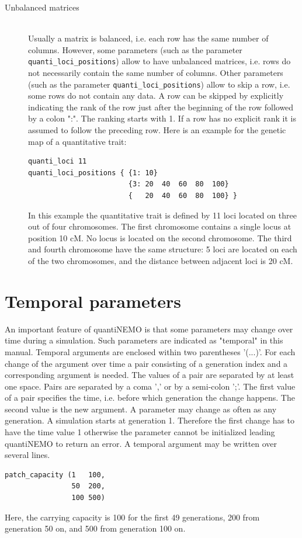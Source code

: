 \documentclass[letterpaper,12pt,oneside]{book}
\begin{document}
\begin{description}
\begin{description}
\item[Unbalanced matrices]\hspace*{\fill}\\
Usually a matrix is balanced, i.e. each row has the same number of columns. However, some parameters (such as the parameter \texttt{quanti\_loci\_positions}) allow to have unbalanced matrices, i.e. rows do not necessarily contain the same number of columns. Other parameters (such as the parameter \texttt{quanti\_loci\_positions}) allow to skip a row, i.e. some rows do not contain any data. A row can be skipped by explicitly indicating the rank of the row just after the beginning of the row followed by a colon ":". The ranking starts with 1. If a row has no explicit rank it is assumed to follow the preceding row. Here is an example for the genetic map of a quantitative trait:
\begin{lstlisting}[frame=single]
quanti_loci 11
quanti_loci_positions { {1: 10}
                        {3: 20  40  60  80  100}
                        {   20  40  60  80  100} }
\end{lstlisting} 
In this example the quantitative trait is defined by 11 loci located on three out of four chromosomes. The first chromosome contains a single locus at position 10 cM. No locus is located on the second chromosome. The third and fourth chromosome have the same structure: 5 loci are located on each of the two chromosomes, and the distance between adjacent loci is 20 cM.
\end{description}
\end{description}

\section{Temporal parameters}\label{tempParam}
An important feature of quantiNEMO is that some parameters may change over time during a simulation. Such parameters are indicated as "temporal" in this manual. Temporal arguments are enclosed within two parentheses '(...)'. For each change of the argument over time a pair consisting of a generation index and a corresponding argument is needed. The values of a pair are separated by at least one space. Pairs are separated by a coma ',' or by a semi-colon ';'. The first value of a pair specifies the time, i.e. before which generation the change happens. The second value is the new argument. A parameter may change as often as any generation. A simulation starts at generation 1. Therefore the first change has to have the time value 1 otherwise the parameter cannot be initialized leading quantiNEMO to return an error. A temporal argument may be written over several lines.
\begin{lstlisting}[frame=single]
patch_capacity (1   100, 
                50  200, 
                100 500)
\end{lstlisting}
Here, the carrying capacity is 100 for the first 49 generations, 200 from generation 50 on, and 500 from generation 100 on. 
\end{document}
